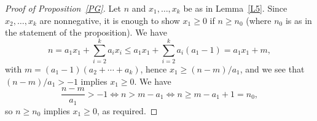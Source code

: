 \documentclass[12pt,letterpaper]{article}
\begin{document}
\begin{proof}[Proof of Proposition~\ref{PG}]
Let $n$ and $x_1,\ldots,x_k$ be as in Lemma~\ref{L5}. Since $x_2,\ldots,x_k$ are nonnegative, it is enough to show $x_1\ge0$ if $n\ge n_0$ (where $n_0$ is as in the statement of the proposition). We have 
\[
n = a_1x_1 + \sum_{i=2}^k a_ix_i \le a_1x_1 + \sum_{i=2}^k a_i(a_1-1) = a_1x_1 + m,
\]
with $m=(a_1-1)(a_2+\cdots+a_k)$, hence $x_1\ge(n-m)/a_1$, and we see that $(n-m)/a_1>-1$ implies $x_1\ge0$. We have
\[
\frac{n-m}{a_1}>-1\Leftrightarrow n>m-a_1\Leftrightarrow n\ge m-a_1+1=n_0,
\]
so $n\ge n_0$ implies $x_1\ge0$, as required.
\end{proof} 

\printbibliography
\end{document}
